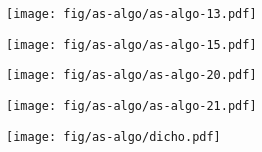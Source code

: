 \documentclass{beamer}
\begin{document}
\begin{frame}
\begin{columns}[t]
\begin{column}{7cm}
{\begin{figure}[h!]
      \end{figure}
      }
      {
        \begin{figure}[h!]
          \centering
          \texttt{[image: fig/as-algo/as-algo-13.pdf]}
      \end{figure}
      }
      {
        \begin{figure}[h!]
          \centering
          \texttt{[image: fig/as-algo/as-algo-15.pdf]}
      \end{figure}
      }
      {
        \begin{figure}[h!]
          \centering
          \texttt{[image: fig/as-algo/as-algo-20.pdf]}
      \end{figure}
      }
      {
        \begin{figure}[h!]
          \centering
          \texttt{[image: fig/as-algo/as-algo-21.pdf]}
      \end{figure}
      }
      {
        \begin{figure}[h!]
          \centering
          \texttt{[image: fig/as-algo/dicho.pdf]}
      \end{figure}
      }
      

\end{column}
\end{columns}
\end{frame}
\end{document}
